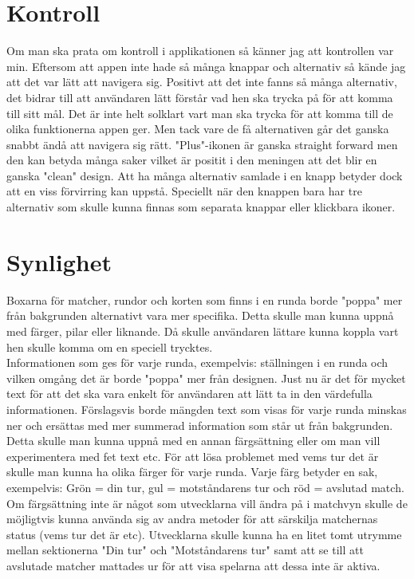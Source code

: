 \documentclass[11pt,a4paper]{article}
\author{FipparN}
\begin{document}
\section{Kontroll}
Om man ska prata om kontroll i applikationen så känner jag att kontrollen var min. Eftersom att appen inte hade så många knappar och alternativ så kände jag att det var lätt att navigera sig. Positivt att det inte fanns så många alternativ, det bidrar till att användaren lätt förstår vad hen ska trycka på för att komma till sitt mål. Det är inte helt solklart vart man ska trycka för att komma till de olika funktionerna appen ger. Men tack vare de få alternativen går det ganska snabbt ändå att navigera sig rätt.
"Plus"-ikonen är ganska straight forward men den kan betyda många saker vilket är positit i den meningen att det blir en ganska "clean" design. Att ha många alternativ samlade i en knapp betyder dock att en viss förvirring kan uppstå. Speciellt när den knappen bara har tre alternativ som skulle kunna finnas som separata knappar eller klickbara ikoner. 

\section{Synlighet}
Boxarna för matcher, rundor och korten som finns i en runda borde "poppa" mer från bakgrunden alternativt vara mer specifika. Detta skulle man kunna uppnå med färger, pilar eller liknande. Då skulle användaren lättare kunna koppla vart hen skulle komma om en speciell trycktes.\\
Informationen som ges för varje runda, exempelvis: ställningen i en runda och vilken omgång det är borde "poppa" mer från designen. Just nu är det för mycket text för att det ska vara enkelt för användaren att lätt ta in den värdefulla informationen. Förslagsvis borde mängden text som visas för varje runda minskas ner och ersättas med mer summerad information som står ut från bakgrunden. Detta skulle man kunna uppnå med en annan färgsättning eller om man vill experimentera med fet text etc. 
För att lösa problemet med vems tur det är skulle man kunna ha olika färger för varje runda. Varje färg betyder en sak, exempelvis: Grön = din tur, gul = motståndarens tur och röd = avslutad match. Om färgsättning inte är något som utvecklarna vill ändra på i matchvyn skulle de möjligtvis kunna använda sig av andra metoder för att särskilja matchernas status (vems tur det är etc). Utvecklarna skulle kunna ha en litet tomt utrymme mellan sektionerna "Din tur" och "Motståndarens tur" samt att se till att avslutade matcher mattades ur för att visa spelarna att dessa inte är aktiva.   
 
\end{document}
